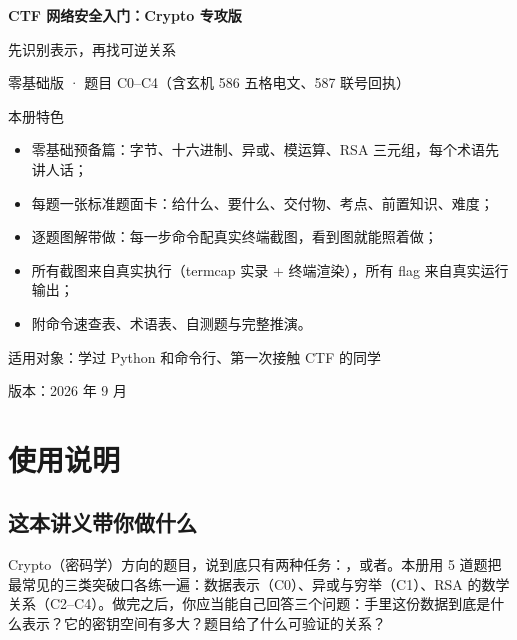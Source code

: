 \documentclass[UTF8,12pt,oneside]{ctexbook}
\begin{document}
\frontmatter

\begin{titlepage}
\centering
\vspace*{32mm}
{\Huge\bfseries CTF 网络安全入门：Crypto 专攻版\par}
\vspace{9mm}
{\LARGE 先识别表示，再找可逆关系\par}
\vspace{5mm}
{\large 零基础版 · 题目 C0--C4（含玄机 586 五格电文、587 联号回执）\par}
\vspace{14mm}
{\large 本册特色\par}
\vspace{3mm}
\begin{minipage}{0.86\linewidth}
\begin{itemize}
\item 零基础预备篇：字节、十六进制、异或、模运算、RSA 三元组，每个术语先讲人话；
\item 每题一张标准题面卡：给什么、要什么、交付物、考点、前置知识、难度；
\item 逐题图解带做：每一步命令配真实终端截图，看到图就能照着做；
\item 所有截图来自真实执行（termcap 实录 + 终端渲染），所有 flag 来自真实运行输出；
\item 附命令速查表、术语表、自测题与完整推演。
\end{itemize}
\end{minipage}
\vfill
{\large 适用对象：学过 Python 和命令行、第一次接触 CTF 的同学\par}
\vspace{4mm}
{\large 版本：2026 年 9 月\par}
\end{titlepage}

\chapter*{使用说明}

\section*{这本讲义带你做什么}
Crypto（密码学）方向的题目，说到底只有两种任务：，或者。本册用 5 道题把最常见的三类突破口各练一遍：数据表示（C0）、异或与穷举（C1）、RSA 的数学关系（C2--C4）。做完之后，你应当能自己回答三个问题：手里这份数据到底是什么表示？它的密钥空间有多大？题目给了什么可验证的关系？
\end{document}

